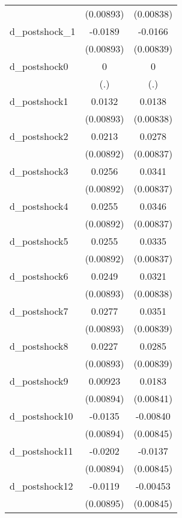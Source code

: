 {\begin{tabular}{l*{2}{c}}
          &(0.00893)         &(0.00838)         \\
d\_postshock\_1&  -0.0189\sym{*}  &  -0.0166\sym{*}  \\
          &(0.00893)         &(0.00839)         \\
d\_postshock0&        0         &        0         \\
          &      (.)         &      (.)         \\
d\_postshock1&   0.0132         &   0.0138         \\
          &(0.00893)         &(0.00838)         \\
d\_postshock2&   0.0213\sym{*}  &   0.0278\sym{***}\\
          &(0.00892)         &(0.00837)         \\
d\_postshock3&   0.0256\sym{**} &   0.0341\sym{***}\\
          &(0.00892)         &(0.00837)         \\
d\_postshock4&   0.0255\sym{**} &   0.0346\sym{***}\\
          &(0.00892)         &(0.00837)         \\
d\_postshock5&   0.0255\sym{**} &   0.0335\sym{***}\\
          &(0.00892)         &(0.00837)         \\
d\_postshock6&   0.0249\sym{**} &   0.0321\sym{***}\\
          &(0.00893)         &(0.00838)         \\
d\_postshock7&   0.0277\sym{**} &   0.0351\sym{***}\\
          &(0.00893)         &(0.00839)         \\
d\_postshock8&   0.0227\sym{*}  &   0.0285\sym{***}\\
          &(0.00893)         &(0.00839)         \\
d\_postshock9&  0.00923         &   0.0183\sym{*}  \\
          &(0.00894)         &(0.00841)         \\
d\_postshock10&  -0.0135         & -0.00840         \\
          &(0.00894)         &(0.00845)         \\
d\_postshock11&  -0.0202\sym{*}  &  -0.0137         \\
          &(0.00894)         &(0.00845)         \\
d\_postshock12&  -0.0119         & -0.00453         \\
          &(0.00895)         &(0.00845)         \\

\end{tabular}}
